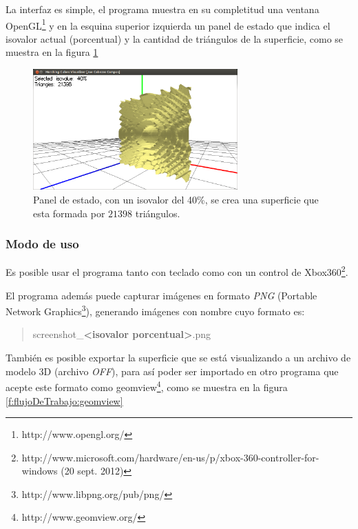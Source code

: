 La interfaz es simple, el programa muestra en su completitud una ventana OpenGL\footnote{http://www.opengl.org/} y en la esquina superior izquierda un panel de estado que indica el isovalor actual (porcentual) y la cantidad de triángulos de la superficie, como se muestra en la figura \ref{f:flujoDeTrabajo:interface}

\begin{figure}[h]
\centering
	\includegraphics[width=0.7\textwidth]{images/visualizer/interface.png}
\caption{Panel de estado, con un isovalor del 40\%, se crea una superficie que esta formada por $21398$ triángulos.}
\label{f:flujoDeTrabajo:interface}
\end{figure}

\subsubsection{Modo de uso}
\label{ch:propuesta:sec:extraccionDeLaSuperficie:subsec:modoDeUso}

Es posible usar el programa tanto con teclado como con un control de Xbox360\textsuperscript{\textregistered}\footnote{http://www.microsoft.com/hardware/en-us/p/xbox-360-controller-for-windows (20 sept. 2012)}.

El programa además puede capturar imágenes en formato \emph{PNG} (Portable Network \mbox{Graphics}\footnote{http://www.libpng.org/pub/png/}), generando imágenes con nombre cuyo formato es:

\begin{quote}
	screenshot\_\textbf{\textless isovalor porcentual\textgreater}.png
\end{quote}

También es posible exportar la superficie que se está visualizando a un archivo de modelo 3D (archivo \emph{OFF}), para así poder ser importado en otro programa que acepte este formato como geomview\footnote{http://www.geomview.org/}, como se muestra en la figura \ref{f:flujoDeTrabajo:geomview}

